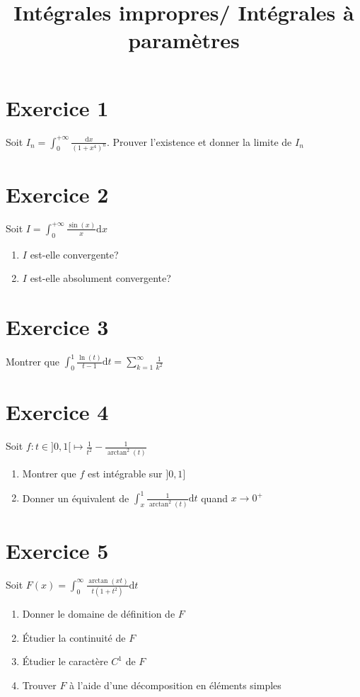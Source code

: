 \documentclass[11pt]{article}
\author{\Name \texttt{\Login}}
\date{}
\title{Intégrales impropres/ Intégrales à paramètres}
\begin{document}
\maketitle

\section*{Exercice 1}

Soit $I_n= \int_0 ^{+\infty} \frac{\mathrm{d}x}{(1+x^4)^n}$. Prouver l'existence et donner la limite de $I_n$ 

\section*{Exercice 2}

Soit $I=\int_0^{+\infty} \frac{\sin(x)}{x}\mathrm{d}x$
\begin{enumerate}
\item $I$ est-elle convergente?
\item $I$ est-elle absolument convergente?
\end{enumerate}

\section*{Exercice 3}

Montrer que $\int_0^1 \frac{\ln(t)}{t-1}\mathrm{d}t = \sum_{k=1}^\infty \frac{1}{k^2}$

\section*{Exercice 4}

Soit $f: t\in ]0,1[ \mapsto \frac{1}{t^2} - \frac{1}{\arctan^2(t)}$

\begin{enumerate}
\item Montrer que $f$ est intégrable sur $]0,1]$
\item Donner un équivalent de $\int_x^1 \frac{1}{\arctan^2(t)}\mathrm{d}t$ quand $x\to 0^{+}$
\end{enumerate}

\section*{Exercice 5}

Soit $F(x) =\int_0^\infty \frac{\arctan(xt)}{t(1+t^2)}\mathrm{d}t$

\begin{enumerate}
\item Donner le domaine de définition de $F$
\item Étudier la continuité de $F$
\item Étudier le caractère $C^1$ de $F$
\item Trouver $F$ à l'aide d'une décomposition en éléments simples
\end{enumerate} 
\end{document}
